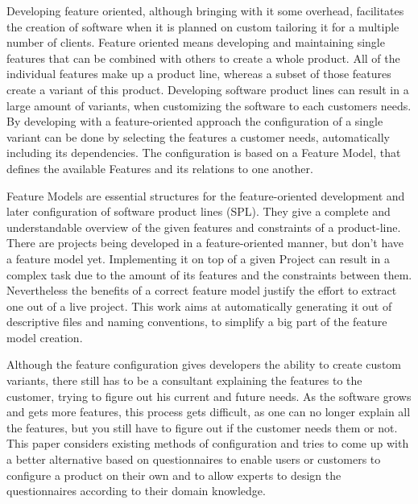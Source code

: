 % 
% 
% 
% 
Developing feature oriented, although bringing with it some overhead, facilitates the creation of software when it is planned on custom tailoring it for a multiple number of clients. Feature oriented means developing and maintaining single features that can be combined with others to create a whole product. All of the individual features make up a product line, whereas a subset of those features create a variant of this product. Developing software product lines can result in a large amount of variants, when customizing the software to each customers needs. By developing with a feature-oriented approach the configuration of a single variant can be done by selecting the features a customer needs, automatically including its dependencies. The configuration is based on a Feature Model, that defines the available Features and its relations to one another.

Feature Models are essential structures for the feature-oriented development and later configuration of software product lines (SPL). They give a complete and understandable overview of the given features and constraints of a product-line. There are projects being developed in a feature-oriented manner, but don't have a feature model yet. Implementing it on top of a given Project can result in a complex task due to the amount of its features and the constraints between them. Nevertheless the benefits of a correct feature model justify the effort to extract one out of a live project. This work aims at automatically generating it out of descriptive files and naming conventions, to simplify a big part of the feature model creation.

Although the feature configuration gives developers the ability to create custom variants, there still has to be a consultant explaining the features to the customer, trying to figure out his current and future needs. As the software grows and gets more features, this process gets difficult, as one can no longer explain all the features, but you still have to figure out if the customer needs them or not. This paper considers existing methods of configuration and tries to come up with a better alternative based on questionnaires to enable users or customers to configure a product on their own and to allow experts to design the questionnaires according to their domain knowledge.
 
